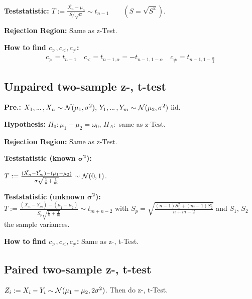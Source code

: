\textbf{Teststatistic:} \(T := \frac{\bar{X_n} - \mu_0}{S / \sqrt{n}} \sim t_{n-1} \qquad (S = \sqrt{S^2})\).

\textbf{Rejection Region:} Same as z-Test.

\textbf{How to find \(c_>, c_<, c_{\neq}\):}
\begin{align*}
  c_> = t_{n-1} \quad c_< = t_{n-1, \alpha} = -t_{n-1, 1-\alpha} \quad c_{\neq} = t_{n-1, 1 - \frac{\alpha}{2}}
\end{align*}

\subsection{Unpaired two-sample z-, t-test}
\textbf{Pre.:} \(X_1, \sdots, X_{n} \sim \Normal(\mu_1, \sigma^2), \, Y_1, \sdots, Y_{m} \sim \Normal(\mu_2, \sigma^2)\) iid.

\textbf{Hypothesis:} \(H_0: \mu_1 - \mu_2 = \omega_0\), \(H_A:\) same as z-Test.

\textbf{Rejection Region:} Same as z-Test.

\textbf{Teststatistic (known \(\bm{\sigma^2}\)):}
\begin{center}
  \(T := \frac{(\bar{X_{n}} - \bar{Y_{m}}) - (\mu_1 - \mu_2)}{\sigma\sqrt{\frac{1}{n} + \frac{1}{m}}} \sim \operatorname{\mathcal{N}}(0, 1)\).
\end{center}

\textbf{Teststatistic (unknown \(\bm{\sigma^2}\)):} \\
\(T := \frac{(\bar{X_{n}} - \bar{Y_{m}}) - (\mu_1 - \mu_2)}{S_p\sqrt{\frac{1}{n} + \frac{1}{m}}} \sim t_{m + n - 2}\) with \(S_p = \sqrt{\frac{(n - 1)S_1^2 + (m - 1)S_2^2}{n + m - 2}}\) and \(S_1\), \(S_2\) the sample variances.

\textbf{How to find \(c_>, c_<, c_{\neq}\):} Same as z-, t-Test.

\subsection{Paired two-sample z-, t-test}
\(Z_i := X_i - Y_i \sim \operatorname{\mathcal{N}}(\mu_1 - \mu_2, 2\sigma^2)\). Then do z-, t-Test.

